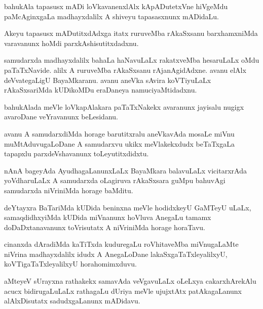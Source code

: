 \begin{mng}
bahukAla tapasusx mADi loVkavanenxlAlx kApADutetxVne hiVgeMdu paMcAginxgaLa madhayxdalilx A shiveyu tapasasxnunx mADidaLu.
\end{mng}

\begin{mng}
Akeyu tapasusx mADutitxdAdxga itatx ruruveMba rAkaSxsanu barxhamxniMda varavanunx hoMdi parxkAshisutitxdadxnu.
\end{mng}

\begin{mng}
samudarxda madhayxdalilx bahaLa haNavuLaLx rakatxveMba hesaruLaLx oMdu paTaTxNavide. alilx A ruruveMba rAkaSxsanu rAjanAgidAdxne. avanu elAlx deVvategaLigU BayaMkaranu. avanu aneVka sAvira koVTiyuLaLx rAkaSxsariMda kUDikoMDu eraDaneya namuciyaMtidadxnu.
\end{mng}

\begin{mng}
bahukAlada meVle loVkapAlakara paTaTxNakekx avaranunx jayisalu nugigx avaroDane veYravanunx beLesidanu.
\end{mng}

\begin{mng}
avanu A samudarxdiMda horage barutitxralu aneVkavAda mosaLe miVnu muMtAduvugaLoDane A samudarxvu ukikx meVlakekxdudx beTaTxgaLa tapapxlu parxdeVshavanunx toLeyutitxdidxtu.
\end{mng}

\begin{mng}
nAnA bageyAda AyudhagaLanunxLaLx BayaMkara balavuLaLx vicitarxrAda yoVdharuLaLx A samudarxda oLagiruva rAkaSxsara guMpu bahuvAgi samudarxda niVriniMda horage baMditu.
\end{mng}

\begin{mng}
deYtayxra BaTariMda kUDida beninxna meVle hodidxkeyU GaMTeyU uLaLx, samaqdidhxyiMda kUDida miVnanunx hoVluva AnegaLu tamamx doDaDxtanavanunx toVrisutatx A niVriniMda horage horaTavu.
\end{mng}

\begin{mng}
cinanxda dAradiMda kaTiTxda kuduregaLu roVhitaveMba miVnugaLaMte niVrina madhayxdalilx idudx A AnegaLoDane lakaSxgaTaTxleyalilxyU, koVTigaTaTxleyalilxyU horahomimxduvu.
\end{mng}

\begin{mng}
aMteyeV sUrayxna rathakekx samavAda veVgavuLaLx oLeLxya cakarxhArekAlu acucx bidirugaLuLaLx rathagaLu dUriya meVle ujujxtAtx patAkagaLanunx alAlxDisutatx sadudxgaLanunx mADidavu.
\end{mng}

